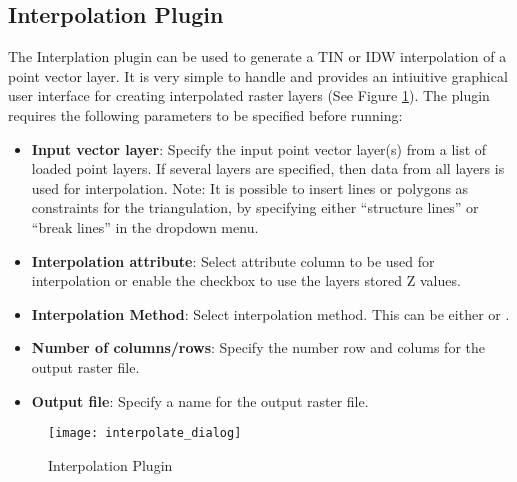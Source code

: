 
\subsection{Interpolation Plugin}


The Interplation plugin can be used to generate a TIN or IDW interpolation of a 
point vector layer. It is very simple to handle and provides an intiuitive graphical 
user interface for creating interpolated raster layers (See Figure \ref{fig:interpolation_dialog}).
The plugin requires the following parameters to be specified before running:

\begin{itemize}
\item \textbf{Input vector layer}: Specify the input point vector layer(s) from a list of loaded
point layers. If several layers are specified, then data from all layers is used for
interpolation. Note: It is possible to insert lines or polygons as constraints for the
triangulation, by specifying either ``structure lines'' or ``break lines'' in the
 dropdown menu.
\item \textbf{Interpolation attribute}: Select attribute column to be used for interpolation or 
enable the  checkbox to use the layers stored Z values.
\item \textbf{Interpolation Method}: Select interpolation method. This can be either  or .
\item \textbf{Number of columns/rows}: Specify the number row and colums for the output raster file.
\item \textbf{Output file}: Specify a name for the output raster file.
\end{itemize}

\begin{figure}[ht]
   \begin{center}
   \caption{Interpolation Plugin \nixcaption}\label{fig:interpolation_dialog}\smallskip
   \texttt{[image: interpolate\_dialog]}
\end{center}  
\end{figure}

\label{interpolation_usage}

